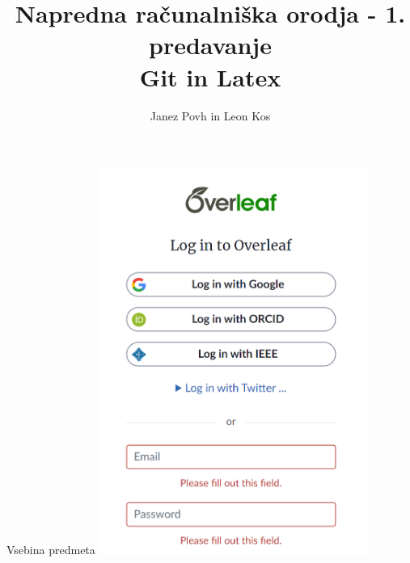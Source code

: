 \documentclass[svgnames]{beamer}
\title[NRO]{Napredna računalniška orodja - 1. predavanje\\ Git in Latex}
\author[J. Povh, L. Kos]{Janez Povh in Leon Kos}
\institute[]{Univerza v Ljubljani, Fakulteta za strojništvo}
\begin{document}
	
	\begin{frame}
		\titlepage
	\end{frame}
	
	
	
	\begin{frame}{Vsebina predmeta}
		\includegraphics[width=250pt]{overleaf}
	\end{frame}
\end{document}
